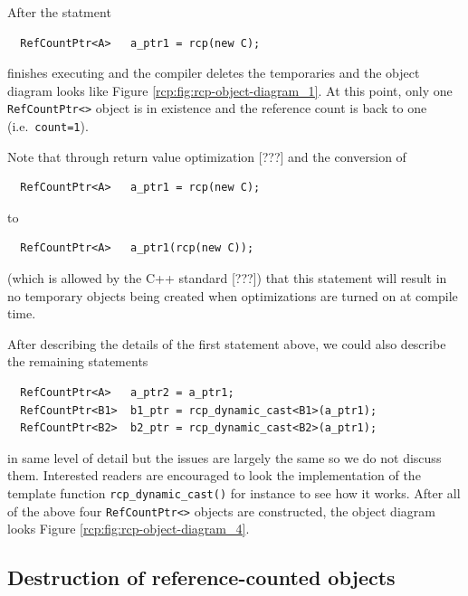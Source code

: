 After the statment
%
{\scriptsize\begin{verbatim}
  RefCountPtr<A>   a_ptr1 = rcp(new C);
\end{verbatim}}
%
{}\noindent{}finishes executing and the compiler deletes the
temporaries and the object diagram looks like Figure
{}\ref{rcp:fig:rcp-object-diagram_1}.  At this point, only one
{}\texttt{Ref\-Count\-Ptr<>} object is in existence and the reference
count is back to one (i.e.~{}\texttt{count=1}).

Note that through return value optimization [???] and the conversion
of
%
{\scriptsize\begin{verbatim}
  RefCountPtr<A>   a_ptr1 = rcp(new C);
\end{verbatim}}
%
{}\noindent{}to
%
{\scriptsize\begin{verbatim}
  RefCountPtr<A>   a_ptr1(rcp(new C));
\end{verbatim}}
%
{}\noindent{}(which is allowed by the C++ standard [???]) that this
statement will result in no temporary objects being created when
optimizations are turned on at compile time.

After describing the details of the first statement above, we could
also describe the remaining statements
%
{\scriptsize\begin{verbatim}
  RefCountPtr<A>   a_ptr2 = a_ptr1;
  RefCountPtr<B1>  b1_ptr = rcp_dynamic_cast<B1>(a_ptr1);
  RefCountPtr<B2>  b2_ptr = rcp_dynamic_cast<B2>(a_ptr1);
\end{verbatim}}
%
{}\noindent{}in same level of detail but the issues are largely the
same so we do not discuss them.  Interested readers are encouraged to
look the implementation of the template function
{}\texttt{rcp\-\_dynamic\-\_cast()} for instance to see how it works.
After all of the above four {}\texttt{Ref\-Count\-Ptr<>} objects are
constructed, the object diagram looks Figure
{}\ref{rcp:fig:rcp-object-diagram_4}.

%
\subsection{Destruction of reference-counted objects}
%

